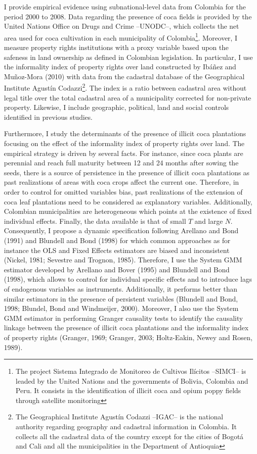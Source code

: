 \documentclass[a4paper, 12pt]{article}
\begin{document}
I provide empirical evidence using subnational-level data from Colombia for the period 2000 to 2008. Data regarding the presence of coca fields is provided by the United Nations Office on Drugs and Crime --UNODC--, which collects the net area used for coca cultivation in each municipality of Colombia\footnote{The project Sistema Integrado de Monitoreo de Cultivos Il\'{i}citos --SIMCI-- is leaded by the United Nations and the governments of Bolivia, Colombia and Peru. It consists in the identification of illicit coca and opium poppy fields through satellite monitoring}. Moreover, I measure property rights institutions with a proxy variable based upon the safeness in land ownership as defined in Colombian legislation. In particular, I use the informality index of property rights over land constructed by Ib\'{a}\~{n}ez and Mu\~{n}oz-Mora (2010) with data from the cadastral database of the Geographical Institute Agust\'{i}n Codazzi\footnote{The Geographical Institute Agust\'{i}n Codazzi --IGAC-- is the national authority regarding geography and cadastral information in Colombia. It collects all the cadastral data of the country except for the cities of Bogot\'{a} and Cali and all the municipalities in the Department of Antioquia}. The index is a ratio between cadastral area without legal title over the total cadastral area of a municipality corrected for non-private property. Likewise, I include geographic, political, land and social controls identified in previous studies.

Furthermore, I study the determinants of the presence of illicit coca plantations focusing on the effect of the informality index of property rights over land. The empirical strategy is driven by several facts. For instance, since coca plants are perennial and reach full maturity between 12 and 24 months after sowing the seeds, there is a source of persistence in the presence of illicit coca plantations as past realizations of areas with coca crops affect the current one. Therefore, in order to control for omitted variables bias, past realizations of the extension of coca leaf plantations need to be considered as explanatory variables. Additionally, Colombian municipalities are heterogeneous which points at the existence of fixed individual effects. Finally, the data available is that of small $T$ and large $N$. Consequently, I propose a dynamic specification following Arellano and Bond (1991) and Blundell and Bond (1998) for which common approaches as for instance the OLS and Fixed Effects estimators are biased and inconsistent (Nickel, 1981; Sevestre and Trognon, 1985). Therefore, I use the System GMM estimator developed by Arellano and Bover (1995) and Blundell and Bond (1998), which allows to control for individual specific effects and to introduce lags of endogenous variables as instruments. Additionally, it performs better than similar estimators in the presence of persistent variables (Blundell and Bond, 1998; Blundel, Bond and Windmeijer, 2000). Moreover, I also use the System GMM estimator in performing Granger causality tests to identify the causality linkage between the presence of illicit coca plantations and the informality index of property rights (Granger, 1969; Granger, 2003; Holtz-Eakin, Newey and Rosen, 1989).
\end{document}
